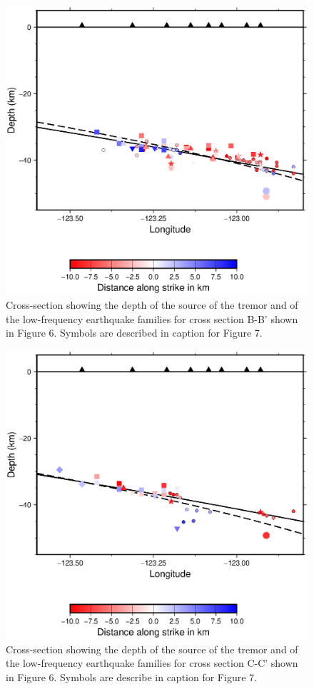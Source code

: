 \documentclass[draft]{agujournal2019}
\begin{document}
\begin{figure}
\noindent\includegraphics[width=\textwidth, trim={0.5cm 5cm 2cm 7.5cm},clip]{figures/section_strike_PWS_PWS_2.eps}
\caption{Cross-section showing the depth of the source of the tremor and of the low-frequency earthquake families for cross section B-B' shown in Figure 6. Symbols are described in caption for Figure 7.}
\label{pngfiguresample}
\end{figure}

\begin{figure}
\noindent\includegraphics[width=\textwidth, trim={0.5cm 5cm 2cm 7.5cm},clip]{figures/section_strike_PWS_PWS_3.eps}
\caption{Cross-section showing the depth of the source of the tremor and of the low-frequency earthquake families for cross section C-C' shown in Figure 6. Symbols are describe in caption for Figure 7.}
\label{pngfiguresample}
\end{figure}
\end{document}
